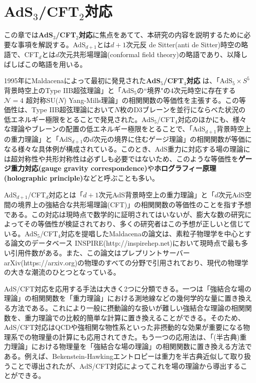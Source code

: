 \chapter{AdS$_3$/CFT$_2$対応}\label{chap:adscftreview}
この章では\textbf{AdS$_3$/CFT$_2$対応}に焦点をあてて、本研究の内容を説明するために必要な事項を解説する。AdS$_{d+1}$とは$d+1$次元反 de Sitter(anti de Sitter)時空の略語で、CFT$_d$とは$d$次元共形場理論(conformal field theory)の略語であり、以降しばしばこの略語を用いる。
\newline

1995年にMaldacenaによって最初に発見された\textbf{AdS$_5$/CFT$_4$対応} \cite{Maldacena:1997re}は、「AdS$_5\times S^5$背景時空上のType IIB超弦理論」と「AdS$_5$の``境界"の$4$次元時空に存在する$\mathcal{N}=4$ 超対称SU($N$) Yang-Mills理論」の相関関数の等価性を主張する。この等価性は、Type IIB超弦理論において$N$枚のD3ブレーンを並行にならべた状況の低エネルギー極限をとることで発見された。AdS$_5$/CFT$_4$対応のほかにも、様々な理論やブレーンの配置の低エネルギー極限をとることで、「AdS$_{d+1}$背景時空上の重力理論」と「AdS$_{d+1}$の$d$次元の境界に住むゲージ理論」の相関関数が等価になる様々な具体例が構成されている\cite{Aharony:1999ti}。このとき、AdS重力に対応する場の理論には超対称性や共形対称性は必ずしも必要ではないため、このような等価性を\textbf{ゲージ重力対応(gauge gravity correspondence)}や\textbf{ホログラフィー原理(holographic principle)}などと呼ぶことも多い。

AdS$_{d+1}$/CFT$_d$対応とは「$d+1$次元AdS背景時空上の重力理論」と「$d$次元AdS空間の境界上の強結合な共形場理論(CFT)」の相関関数の等価性のことを指す予想である。この対応は現時点で数学的に証明されてはいないが、膨大な数の研究によってその等価性が検証されており、多くの研究者はこの予想が正しいと信じている。AdS$_5$/CFT$_4$対応を提唱したMaldacenaの論文\cite{Maldacena:1997re}は、素粒子物理学を中心とする論文のデータベース INSPIRE(http://inspirehep.net)において現時点で最も多い引用件数がある。また、この論文はプレプリントサーバー arXiv(https://arxiv.org)の物理のすべての分野で引用されており、現代の物理学の大きな潮流のひとつとなっている。

AdS/CFT対応を応用する手法は大きく2つに分類できる。一つは「強結合な場の理論」の相関関数を「重力理論」における測地線などの幾何学的な量に置き換える方法である。これにより一般に摂動論的な扱いが難しい強結合な理論の相関関数を、重力理論での比較的簡単な計算に置き換えることができる。そのため、AdS/CFT対応はQCD\cite{Sakai:2004cn}\cite{Kovtun:2004de}や強相関な物性系\cite{Hartnoll_2009}といった非摂動的な効果が重要になる物理系での物理量の計算にも応用されてきた。もう一つの応用法は、「(半古典)重力理論」における物理量を「強結合な場の理論」の相関関数に置き換える方法である。例えば、Bekenstein-Hawkingエントロピーは重力を半古典近似して取り扱うことで導出されたが、AdS/CFT対応によってこれを場の理論から導出することができる\cite{Strominger:1996sh}\cite{Strominger:1997eq}。
\newline

